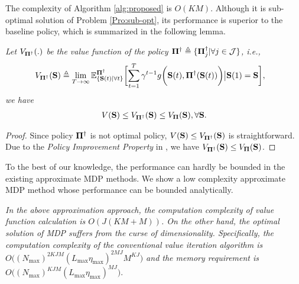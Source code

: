 The complexity of Algorithm \ref{alg:proposed} is $O(KM)$.
Although it is sub-optimal solution of Problem \ref{Pro:sub-opt}, its performance is superior to the baseline policy, which is summarized in the following lemma.
\begin{lemma} \em
    Let $V_{{\mathbf{\Pi}}^{\dagger}}(.)$ be the value function of the policy ${\mathbf{\Pi}}^{\dagger}\triangleq\{\mathbf{\Pi}_{j}^{\dagger}|\forall j\in \mathcal{J}\}$, i.e.,
    \begin{align}
        &V_{{\Baseline}^{\dagger}}(\Stat) \define \lim\limits_{T\to\infty}\mathbb{E}_{\{\Stat(t)|\forall t\}}^{{\Baseline}^{\dagger}}\Bracket{
            \sum_{t=1}^{T} \gamma^{t-1}g\Paren{\Stat(t),{\Baseline}^{\dagger}(\Stat(t))}\big|\Stat(1)=\Stat
        },
    \end{align}
    we have
    \begin{align}
        V(\mathbf{S})\leq V_{{\mathbf{\Pi}}^{\dagger}}(\mathbf{S})\leq V_{{\mathbf{\Pi}}}(\mathbf{S}), \forall \mathbf{S}.
    \end{align}
\end{lemma}
\begin{proof}
    Since policy $\mathbf{\Pi}^{\dagger}$ is not optimal policy, $V(\mathbf{S})\leq V_{{\mathbf{\Pi}}^{\dagger}}(\mathbf{S})$ is straightforward.
    Due to the \emph{Policy Improvement Property} in \cite{dp-control}, we have $V_{{\mathbf{\Pi}}^{\dagger}}(\mathbf{S})\leq	V_{{\mathbf{\Pi}}}(\mathbf{S})$.
\end{proof}

To the best of our knowledge, the performance can hardly be bounded in the existing approximate MDP methods.
We show a low complexity approximate MDP method whose performance can be bounded analytically.
\begin{remark} \em
 In the above approximation approach, the computation complexity of
    value function calculation is $O(J(KM+M))$. 
    On the other hand, the optimal solution of MDP suffers from the curse of dimensionality. Specifically, the computation complexity of the conventional value
    iteration algorithm is $O\Big((N_{{\max}})^{2KJM}(L_{{\max}}\eta_{{\max}})^{2MJ}M^{KJ}\Big)$ and the memory requirement is $O\Big((N_{{\max}})^{KJM}(L_{{\max}}\eta_{{\max}})^{MJ}\Big).$
\end{remark}


